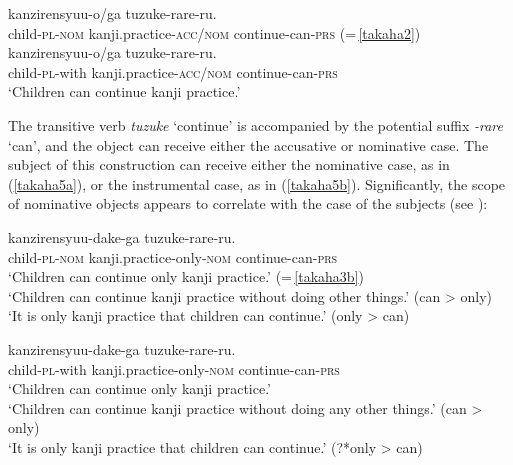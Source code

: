 \documentclass[output=paper]{langscibook}
\begin{document}
\begin{exe}
\ex \label{takaha5}
\begin{xlist}
\ex \label{takaha5a}
 {kanzirensyuu-o/ga} {tuzuke-rare-ru.}\\
	child-\textsc{pl}-\textsc{nom}  kanji.practice-\textsc{acc/nom} continue-can-\textsc{prs} (=\,\ref{takaha2})\\ 
	
\ex \label{takaha5b}
 {kanzirensyuu-o/ga} {tuzuke-rare-ru.}\\
	child-\textsc{pl}-with       kanji.practice-\textsc{acc/nom} continue-can-\textsc{prs}\\
\glt `Children can continue kanji practice.' \\
\end{xlist}
\end{exe}

The transitive verb \emph{tuzuke} ‘continue’ is accompanied by the potential suffix \emph{-rare} ‘can’, and the object can receive either the accusative or nominative case. The subject of this construction can receive either the nominative case, as in (\ref{takaha5a}), or the instrumental case, as in (\ref{takaha5b}). Significantly, the scope of nominative objects appears to correlate with the case of the subjects (see \citealt{Ebina2020}):

\begin{exe}
\ex 
\begin{xlist}
\ex \label{takaha6a}
 {kanzirensyuu-dake-ga} {tuzuke-rare-ru.}\\
	child-\textsc{pl}-\textsc{nom}       kanji.practice-only-\textsc{nom} continue-can-\textsc{prs}\\
\glt `Children can continue only kanji practice.’ (=\,\ref{takaha3b})\\
‘Children can continue kanji practice without doing other things.’ (can \textgreater{} only)\\
‘It is only kanji practice that children can continue.’ (only \textgreater{} can)

\ex \label{takaha6b}
 {kanzirensyuu-dake-ga} {tuzuke-rare-ru.}\\
	child-\textsc{pl}-with kanji.practice-only-\textsc{nom} continue-can-\textsc{prs}\\
\glt `Children can continue only kanji practice.’\\
`Children can continue kanji practice without doing any other things.' (can \textgreater{} only)\\
`It is only kanji practice that children can continue.’ (?*only \textgreater{} can)
\end{xlist}
\end{exe}\largerpage
\end{document}
